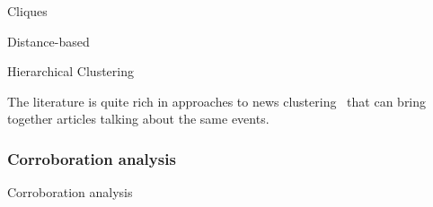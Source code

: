 Cliques

Distance-based

Hierarchical Clustering








The literature is quite rich in approaches to news clustering~\cite{carpineto2009survey,jones1972statistical} %
that can bring together articles talking about the same events.










\subsubsection{Corroboration analysis}
Corroboration analysis

